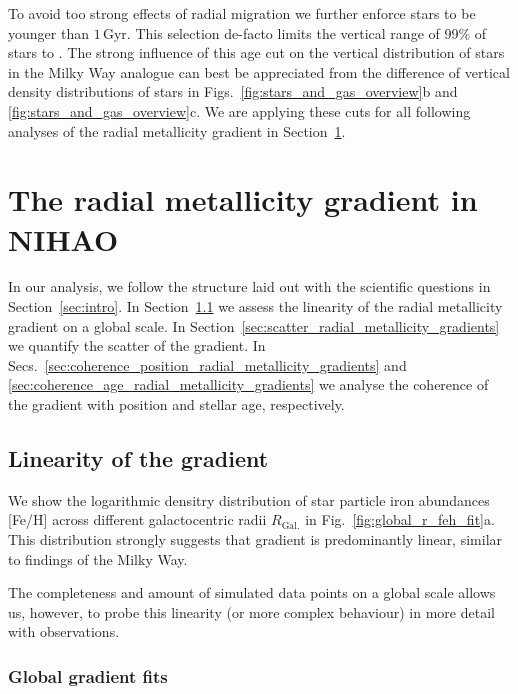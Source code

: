 \documentclass[fleqn,usenatbib]{mnras}
\begin{document}
To avoid too strong effects of radial migration \citep{Binney2008, Frankel2018} we further enforce stars to be younger than $1\,\mathrm{Gyr}$. This selection de-facto limits the vertical range of 99\% of stars to . The strong influence of this age cut on the vertical distribution of stars in the Milky Way analogue can best be appreciated from the difference of vertical density distributions of stars in Figs.~\ref{fig:stars_and_gas_overview}b and \ref{fig:stars_and_gas_overview}c. We are applying these cuts for all following analyses of the radial metallicity gradient in Section~\ref{sec:radial_metallicity_gradients}.


\section{The radial metallicity gradient in NIHAO}
\label{sec:radial_metallicity_gradients}

In our analysis, we follow the structure laid out with the scientific questions in Section~\ref{sec:intro}. In Section~\ref{sec:linear_radial_metallicity_gradients} we assess the linearity of the radial metallicity gradient on a global scale. In Section~\ref{sec:scatter_radial_metallicity_gradients} we quantify the scatter of the gradient. In Secs.~\ref{sec:coherence_position_radial_metallicity_gradients} and \ref{sec:coherence_age_radial_metallicity_gradients} we analyse the coherence of the gradient with position and stellar age, respectively.

\subsection{Linearity of the gradient}
\label{sec:linear_radial_metallicity_gradients}

We show the logarithmic densitry distribution of star particle iron abundances [Fe/H] across different galactocentric radii $R_\mathrm{Gal.}$ in Fig.~\ref{fig:global_r_feh_fit}a. This distribution strongly suggests that gradient is predominantly linear, similar to findings of the Milky Way.

The completeness and amount of simulated data points on a global scale allows us, however, to probe this linearity (or more complex behaviour) in more detail with observations.

\subsubsection{Global gradient fits}
\end{document}
